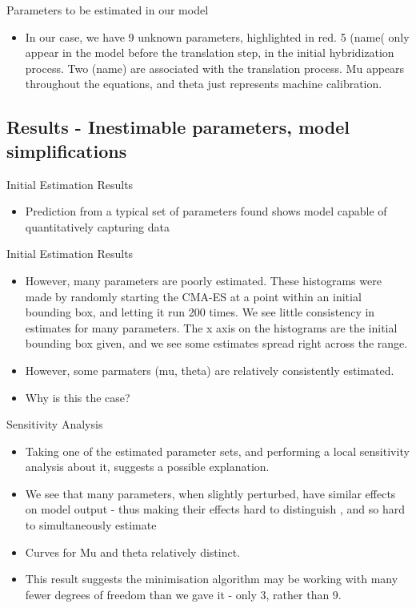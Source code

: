 \documentclass[8pt]{beamer}
\begin{document}
\begin{frame}{Parameters to be estimated in our model}
  \begin{itemize}
\item In our case, we have 9 unknown parameters, highlighted in red. 5 (name( only appear in the model before the translation step, in the initial hybridization process. Two (name) are associated with the translation process. Mu appears throughout the equations, and theta just represents machine calibration.

\end{itemize}
\end{frame}
\normalsize


\subsection{Results - Inestimable parameters, model simplifications}

\begin{frame}{Initial Estimation Results}
\begin{itemize}
    \item Prediction from a typical set of parameters found shows model capable of quantitatively capturing data
\end{itemize}
\end{frame}


\begin{frame}{Initial Estimation Results}
\begin{itemize}
    \item However, many parameters are poorly estimated. These histograms were made by randomly starting the CMA-ES at a point within an initial bounding box, and letting it run 200 times. We see little consistency in estimates for many parameters. The x axis on the histograms are the initial bounding box given, and we see some estimates spread right across the range. 
    \item However, some parmaters (mu, theta) are relatively consistently estimated.
    \item Why is this the case? 
\end{itemize}
\end{frame}

\begin{frame}{Sensitivity Analysis}
\begin{itemize}
    \item Taking one of the estimated parameter sets, and performing a local sensitivity analysis about it, suggests a possible explanation.
    \item We see that many parameters, when slightly perturbed, have similar effects on model output - thus making their effects hard to distinguish , and so hard to simultaneously estimate 
    \item Curves for Mu and theta relatively distinct.
    \item This result suggests the minimisation algorithm may be working with many fewer degrees of freedom than we gave it - only 3, rather than 9. 
\end{itemize}
\end{frame}
\end{document}
